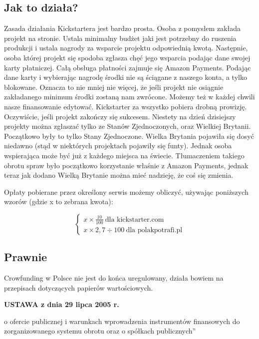 \documentclass[12pt, a4paper]{article}
\newcommand{\przepis}{\textbf{USTAWA
z dnia 29 lipca 2005 r.}


o ofercie publicznej i warunkach wprowadzenia instrumentów finansowych do zorganizowanego systemu obrotu oraz o spółkach publicznych''}
\begin{document}
\subsection{Jak to działa?}
\label{sec:jakd}

Zasada działania Kickstartera jest bardzo prosta. Osoba z pomysłem zakłada projekt na stronie. Ustala minimalny budżet jaki jest potrzebny do ruszenia produkcji i ustala nagrody za wsparcie projektu odpowiednią kwotą. Następnie, osoba której projekt się spodoba zgłasza chęć jego wsparcia podając dane swojej karty płatniczej. Całą obsługa płatności zajmuje się Amazon Payments. Podając dane karty i wybierając nagrodę środki nie są ściągane z naszego konta, a tylko blokowane. Oznacza to nie mniej nie więcej, że jeśli projekt nie osiągnie zakładanego minimum środki zostaną nam zwrócone. Możemy też w każdej chwili nasze finansowanie edytować. Kickstarter za wszystko pobiera drobną prowizję. Oczywiście, jeśli projekt zakończy się sukcesem. Niestety na dzień dzisiejszy projekty można zgłaszać tylko ze Stanów Zjednoczonych, oraz Wielkiej Brytanii. Początkowo były to tylko Stany Zjednoczone. Wielka Brytania pojawiła się dosyć niedawno (stąd w niektórych projektach pojawiły się funty). Jednak osoba wspierająca może być już z każdego miejsca na świecie. Tłumaczeniem takiego obrotu spraw było początkowo korzystanie właśnie z Amazon Payments, jednak teraz jak dodano Wielką Brytanie można mieć nadzieję, że coś się zmienia.

Opłaty pobierane przez określony serwis możemy obliczyć, używając poniższych wzorów (gdzie x to zebrana kwota):


\[
 \left\{
 \begin{matrix}
  x\times\frac{10}{100} ~ \text{dla kickstarter.com} \\
  x\times2,7\div100 ~ \text{dla polakpotrafi.pl}
 \end{matrix}
 \right.
\]

\newpage

\subsection{Prawnie}

Crowfunding w Polsce nie jest do końca uregulowany, działa bowiem na przepisach dotyczących papierów wartościowych.


\przepis
\end{document}

